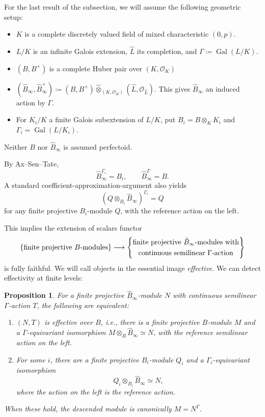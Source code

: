 \documentclass[10pt,twoside]{article}
\numberwithin{equation}{section}
\theoremstyle{plain}
\newtheorem{myprop}[mythm]{Proposition}
\theoremstyle{definition}
\DeclareMathOperator{\Gal}{Gal}
\newcommand{\MCO}{\mathcal{O}}
\begin{document}
For the last result of the subsection, we will assume the following geometric setup:
\begin{itemize}
    \item \(K\) is a complete discretely valued field of mixed characteristic \((0,p)\).
    \item \(L/K\) is an infinite Galois extension, \(\widehat L\) its completion, and \(\Gamma\coloneqq\Gal(L/K)\).
    \item \((B,B^+)\) is a complete Huber pair over \((K,\MCO_K)\)
	\item \((\hat B_\infty,\hat B_\infty^+)\coloneqq(B,B^+)\widehat\otimes_{(K,\MCO_K)}(\widehat L,\MCO_{\widehat L})\). This gives \(\hat B_\infty\) an induced action by \(\Gamma\).
	\item For \(K_i/K\) a finite Galois subextension of \(L/K\), put \(B_i=B\otimes_K K_i\) and \(\Gamma_i=\Gal(L/K_i).\)
\end{itemize}
Neither \(B\) nor \(\hat B_\infty\) is assumed perfectoid.\par
By Ax--Sen--Tate, 
\[\hat B_\infty^{\Gamma_i}=B_i,\qquad \hat B_\infty^\Gamma=B.\]
A standard coefficient-approximation-argument also yields 
\[
(Q\otimes_{B_i}\hat B_\infty)^{\Gamma_i}=Q
\]
for any finite projective \(B_i\)-module \(Q\), with the reference action on the left.\par
This implies the extension of scalars functor
\[
\{\text{\emph{finite projective \(B\)-modules}}\} \longrightarrow
\left\{\begin{gathered}
\text{\emph{finite projective \(\hat B_\infty\)-modules with}}\\
\text{\emph{continuous semilinear \(\Gamma\)-action}}
\end{gathered}\right\}
\]
is fully faithful. We will call objects in the essential image \emph{effective}. We can detect effectivity at finite levels:

\begin{myprop}\label{proposalFiniteEffectivity}
For a  finite projective \(\hat B_\infty\)-module \(N\) with continuous semilinear \(\Gamma\)-action \(T\), the following are equivalent:
\begin{enumerate}
\item \((N,T)\) is effective over \(B\), i.e., there is a finite projective \(B\)-module \(M\) and a \(\Gamma\)-equivariant isomorphism \(M\otimes_B \hat B_\infty\simeq N\), with the reference semilinear action on the left.
\item For some \(i\), there are a finite projective \(B_i\)-module \(Q_i\) and a \(\Gamma_i\)-equivariant isomorphism
\[
Q_i\otimes_{B_i}\hat B_\infty\simeq N,
\]
where the action on the left is the reference action.
\end{enumerate}
When these hold, the descended module is canonically \(M=N^\Gamma\). 
\end{myprop}
\end{document}
